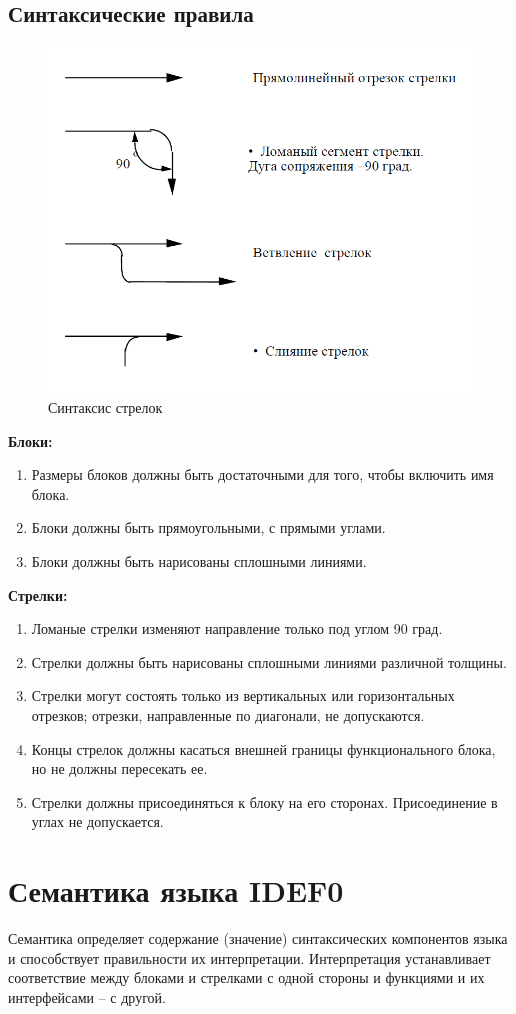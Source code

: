 \documentclass[a4paper, final]{article}
\begin{document}
\subsection{Синтаксические правила}
\begin{figure}[H]
   \centering
   \includegraphics[width=0.7\linewidth]{arrows.png}
   \caption{Синтаксис стрелок}
   \label{img:arrows}
\end{figure}

\noindent \textbf{Блоки:}
\begin{enumerate}
  \item Размеры блоков должны быть достаточными для того, чтобы включить имя блока.
  \item Блоки должны быть прямоугольными, с прямыми углами.
  \item Блоки должны быть нарисованы сплошными линиями.
\end{enumerate}

\noindent \textbf{Стрелки:}
\begin{enumerate}
  \item Ломаные стрелки изменяют направление только под углом 90 град.
  \item Стрелки должны быть нарисованы сплошными линиями различной толщины.
  \item Стрелки могут состоять только из вертикальных или горизонтальных отрезков; отрезки, направленные по диагонали, не допускаются.
  \item Концы стрелок должны касаться внешней границы функционального блока, но не должны пересекать ее.
  \item Стрелки должны присоединяться к блоку на его сторонах. Присоединение в углах не допускается.
\end{enumerate}

\newpage
\section{Семантика языка IDEF0}
Семантика определяет содержание (значение) синтаксических компонентов языка и способствует правильности их интерпретации. Интерпретация устанавливает соответствие между блоками и стрелками с одной стороны и функциями и их интерфейсами -- с другой.
\end{document}
